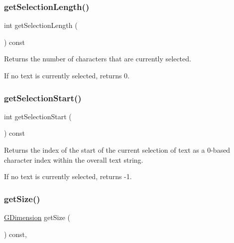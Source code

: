\subsubsection{\texorpdfstring{get\+Selection\+Length()}{getSelectionLength()}}
{\footnotesize\ttfamily int get\+Selection\+Length (\begin{DoxyParamCaption}{ }\end{DoxyParamCaption}) const\hspace{0.3cm}{\ttfamily [virtual]}}



Returns the number of characters that are currently selected. 

If no text is currently selected, returns 0. \mbox{\label{classGBrowserPane_aad7c986a677c1b9cf445cd7cfb6a8975}} 
\subsubsection{\texorpdfstring{get\+Selection\+Start()}{getSelectionStart()}}
{\footnotesize\ttfamily int get\+Selection\+Start (\begin{DoxyParamCaption}{ }\end{DoxyParamCaption}) const\hspace{0.3cm}{\ttfamily [virtual]}}



Returns the index of the start of the current selection of text as a 0-\/based character index within the overall text string. 

If no text is currently selected, returns -\/1. \mbox{\label{classGInteractor_a7b4eec96a2bdc6420695d5796a78eea9}} 
\subsubsection{\texorpdfstring{get\+Size()}{getSize()}}
{\footnotesize\ttfamily \mbox{\hyperlink{classGDimension}{G\+Dimension}} get\+Size (\begin{DoxyParamCaption}{ }\end{DoxyParamCaption}) const\hspace{0.3cm}{\ttfamily [virtual]}, {\ttfamily [inherited]}}




